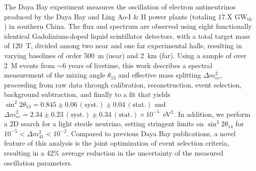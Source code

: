 The Daya Bay experiment measures the oscillation of electron antineutrinos produced by the Daya Bay and Ling Ao-I \& II power plants (totaling 17.X GW$_\mathrm{th}$) in southern China. The flux and spectrum are observed using eight functionally identical Gadolinium-doped liquid scintillator detectors, with a total target mass of 120~T, divided among two near and one far experimental halls, resulting in varying baselines of order 500~m (near) and 2~km (far). Using a sample of over 2~M events from $\sim$6 years of livetime, this work describes a spectral measurement of the mixing angle $\theta_{13}$ and effective mass splitting $\Delta m^2_{ee}$, proceeding from raw data through calibration, reconstruction, event selection, background subtraction, and finally to a fit that yields $\sin^2 2\theta_{13} = 0.845 \pm 0.06\,\mathrm{(syst.)} \pm 0.04\,\mathrm{(stat.)}$ and $\Delta m^2_{ee} = 2.34 \pm 0.23\,\mathrm{(syst.)} \pm 0.34\,\mathrm{(stat.)} \times 10^{-5}$~eV$^2$. In addition, we perform a 2D search for a light sterile neutrino, setting stringent limits on $\sin^2 2\theta_{14}$ for $10^{-5} < \Delta m^2_{41} < 10^{-2}$. Compared to previous Daya Bay publications, a novel feature of this analysis is the joint optimization of event selection criteria, resulting in a 42$\%$ average reduction in the uncertainty of the measured oscillation parameters.